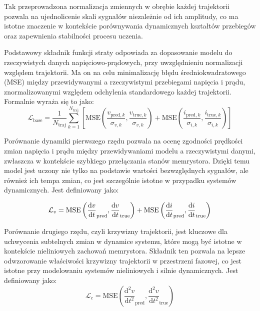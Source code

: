 \documentclass[11pt, oneside]{article}
\newcommand{\dert}[1]{\frac{{\rm d} {#1}}{{\rm d} t} }
\begin{document}
Tak przeprowadzona normalizacja zmiennych w obrębie każdej trajektorii pozwala na ujednolicenie skali sygnałów niezależnie od ich amplitudy, co ma istotne znaczenie w kontekście porównywania dynamicznych kształtów przebiegów oraz zapewnienia stabilności procesu uczenia.

Podstawowy składnik funkcji straty odpowiada za dopasowanie modelu do rzeczywistych danych napięciowo-prądowych, przy uwzględnieniu normalizacji względem trajektorii. Ma on na celu minimalizację błędu średniokwadratowego (MSE) między przewidywanymi a rzeczywistymi przebiegami napięcia i prądu, znormalizowanymi względem odchylenia standardowego każdej trajektorii. Formalnie wyraża się to jako:
\begin{equation*}
    \mathcal{L}_{\mathrm{base}} = \frac{1}{N_{\text{traj}}} \sum_{k=1}^{N_{\text{traj}}} \left[\mathrm{MSE}\left(\frac{v_{\mathrm{pred},k}}{\sigma_{v,k}}, \frac{v_{\mathrm{true},k}}{\sigma_{v,k}}\right) +  \mathrm{MSE}\left(\frac{i_{\mathrm{pred},k}}{\sigma_{i,k}}, \frac{i_{\mathrm{true},k}}{\sigma_{i,k}}\right)\right]
\end{equation*}

Porównanie dynamiki pierwszego rzędu pozwala na ocenę zgodności prędkości zmian napięcia i prądu między przewidywaniami modelu a rzeczywistymi danymi, zwłaszcza w kontekście szybkiego przełączania stanów memrystora. Dzięki temu model jest uczony nie tylko na podstawie wartości bezwzględnych sygnałów, ale również ich tempa zmian, co jest szczególnie istotne w przypadku systemów dynamicznych. Jest definiowany jako:

\begin{equation}
    \mathcal{L}_{v} = \mathrm{MSE}\left(\dert{v}_{\mathrm{pred}}, \dert{v}_{\mathrm{true}}\right) + \mathrm{MSE}\left(\dert{i}_{\mathrm{pred}}, \dert{i}_{\mathrm{true}}\right)
\end{equation}


Porównanie drugiego rzędu, czyli krzywizny trajektorii, jest kluczowe dla uchwycenia subtelnych zmian w dynamice systemu, które mogą być istotne w kontekście nieliniowych zachowań memrystora. Składnik ten pozwala na lepsze odwzorowanie właściwości krzywizny trajektorii w przestrzeni fazowej, co jest istotne przy modelowaniu systemów nieliniowych i silnie dynamicznych. Jest definiowany jako:
\begin{equation}
    \mathcal{L}_{c} = \mathrm{MSE}\left(\frac{\mathrm{d}^2v}{\mathrm{d}t^2}_{\mathrm{pred}}, \frac{\mathrm{d}^2v}{\mathrm{d}t^2}_{\mathrm{true}}\right)
\end{equation}
\end{document}
